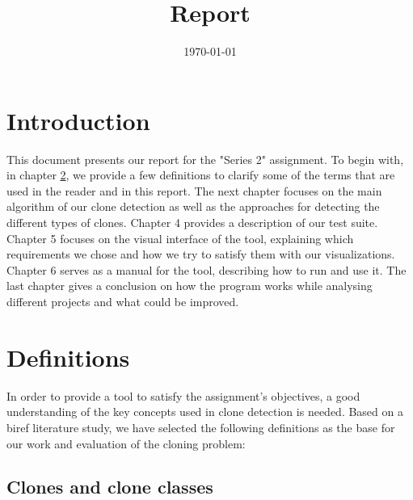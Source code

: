 \documentclass{uva-inf-article}
\title{Report}
\date{\today}
\begin{document}
\maketitle




\section{Introduction}

This document presents our report for the "Series 2" assignment. To begin with, in chapter \ref{definitions}, we provide a few definitions to clarify some of the terms that are used in the reader and in this report. The next chapter focuses on the main algorithm of our clone detection as well as the approaches for detecting the different types of clones. Chapter 4 provides a description of our test suite. Chapter 5 focuses on the visual interface of the tool, explaining which requirements we chose and how we try to satisfy them with our visualizations. Chapter 6 serves as a manual for the tool, describing how to run and use it. The last chapter gives a conclusion on how the program works while analysing different projects and what could be improved.

\section{Definitions}\label{definitions}

In order to provide a tool to satisfy the assignment's objectives, a good understanding of the key concepts used in clone detection is needed. Based on a biref literature study, we have selected the following definitions as the base for our work and evaluation of the cloning problem:

\subsection{Clones and clone classes}
\end{document}
